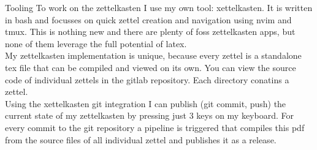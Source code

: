 \documentclass[class=article, crop=false]{standalone}
\begin{document}
\begin{zettel}{Tooling}
To work on the zettelkasten I use my own tool: xettelkasten. It is written in bash and focusses on quick zettel creation and navigation using nvim and tmux. This is nothing new and there are plenty of foss zettelkasten apps, but none of them leverage the full potential of latex.\\

My zettelkasten implementation is unique, because every zettel is a standalone tex file that can be compiled and viewed on its own. You can view the source code of individual zettels in the gitlab repository. Each directory conatins a zettel.\\

Using the xettelkasten git integration I can publish (git commit, push) the current state of my zettelkasten by pressing just 3 keys on my keyboard. For every commit to the git repository a pipeline is triggered that compiles this pdf from the source files of all individual zettel and publishes it as a release.
\end{zettel}
\end{document}
